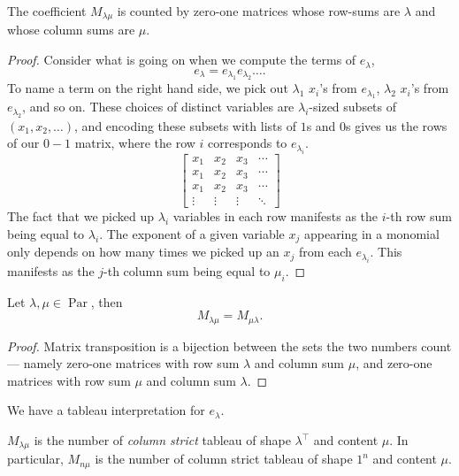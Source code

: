 \documentclass{article}
\DeclareMathOperator{\Par}{Par}
\begin{document}
\begin{theorem} 
    \label{thm:e2mCombInterpretation}
    The coefficient $M_{\lambda\mu}$ is counted by zero-one matrices whose row-sums are $\lambda$ and whose column sums are $\mu$.
\end{theorem}

\begin{proof}
    Consider what is going on when we compute the terms of $e_\lambda$,
    \[
        e_\lambda = e_{\lambda_1}e_{\lambda_2}\ldots.
    \]
    To name a term on the right hand side, we pick out $\lambda_1$ $x_i$'s from $e_{\lambda_1}$, $\lambda_2$ $x_i$'s from $e_{\lambda_2}$, and so on.
    These choices of distinct variables are $\lambda_i$-sized subsets of $(x_1, x_2, \ldots)$, and encoding these subsets with lists of $1$s and $0$s gives us the rows of our $0-1$ matrix, where the row $i$ corresponds to $e_{\lambda_i}$.     
    \[
        \begin{bmatrix}
            x_1 & x_2 & x_3 & \cdots \\
            x_1 & x_2 & x_3 & \cdots \\
            x_1 & x_2 & x_3 & \cdots \\
            \vdots & \vdots & \vdots & \ddots 
        \end{bmatrix}
    \]
    The fact that we picked up $\lambda_i$ variables in each row manifests as the $i$-th row sum being equal to $\lambda_i$.
The exponent of a given variable $x_j$ appearing in a monomial only depends on how many times we picked up an $x_j$ from each $e_{\lambda_i}$. 
This manifests as the $j$-th column sum being equal to $\mu_i$.
\end{proof}


\begin{theorem} \label{thm:e2msymmetric}
    Let $\lambda,\mu \in \Par$, then
    \[
        M_{\lambda\mu} = M_{\mu\lambda}.
    \]
\end{theorem}

\begin{proof}
    Matrix transposition is a bijection between the sets the two numbers count--- namely zero-one matrices with row sum $\lambda$ and column sum $\mu$, and zero-one matrices with row sum $\mu$ and column sum $\lambda$.
\end{proof}

We have a tableau interpretation for $e_\lambda$.

\begin{proposition}
    \label{prop:eTableauInterpretation}
    $M_{\lambda\mu}$ is the number of \textit{column strict} tableau of shape $\lambda^\top$ and content $\mu$.
    In particular, $M_{n\mu}$ is the number of column strict tableau of shape $1^n$ and content $\mu$.
\end{proposition}
\end{document}
